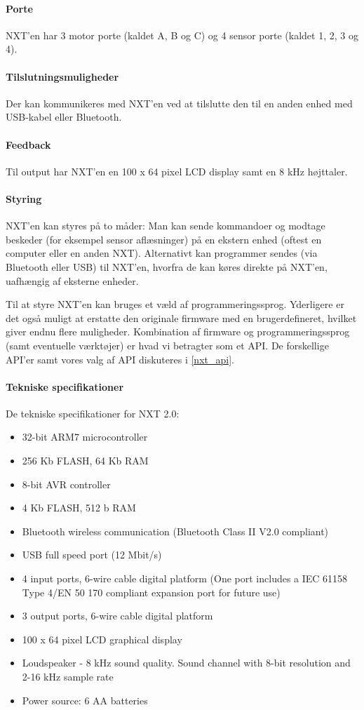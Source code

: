 \paragraph{Porte}
NXT'en har 3 motor porte (kaldet A, B og C) og 4 sensor porte (kaldet 1, 2, 3 og 4).

\paragraph{Tilslutningsmuligheder}
Der kan kommunikeres med NXT'en ved at tilslutte den til en anden enhed med USB-kabel eller Bluetooth\textregistered.

\paragraph{Feedback}
Til output har NXT'en en 100 x 64 pixel LCD display samt en 8 kHz højttaler.

\paragraph{Styring}
NXT'en kan styres på to måder:
Man kan sende kommandoer og modtage beskeder (for eksempel sensor aflæsninger) på en ekstern enhed (oftest en computer eller en anden NXT).
Alternativt kan programmer sendes (via Bluetooth eller USB) til NXT'en, hvorfra de kan køres direkte på NXT'en, uafhængig af eksterne enheder.

Til at styre NXT'en kan bruges et væld af programmeringssprog.
Yderligere er det også muligt at erstatte den originale firmware med en brugerdefineret, hvilket giver endnu flere muligheder.
Kombination af firmware og programmeringssprog (samt eventuelle værktøjer) er hvad vi betragter som et API.
De forskellige API'er samt vores valg af API diskuteres i \cref{nxt_api}.

\paragraph{Tekniske specifikationer}
De tekniske specifikationer for NXT 2.0:\cite{nxt}
\begin{itemize}
\item{32-bit ARM7 microcontroller}
\item{256 Kb FLASH, 64 Kb RAM}
\item{8-bit AVR controller}
\item{4 Kb FLASH, 512 b RAM}
\item{Bluetooth wireless communication (Bluetooth Class II V2.0 compliant)}
\item{USB full speed port (12 Mbit/s)}
\item{4 input ports, 6-wire cable digital platform (One port includes a IEC 61158 Type 4/EN 50 170 compliant expansion port for future use)}
\item{3 output ports, 6-wire cable digital platform}
\item{100 x 64 pixel LCD graphical display}
\item{Loudspeaker - 8 kHz sound quality. Sound channel with 8-bit resolution and 2-16 kHz sample rate}
\item{Power source: 6 AA batteries}
\end{itemize}

